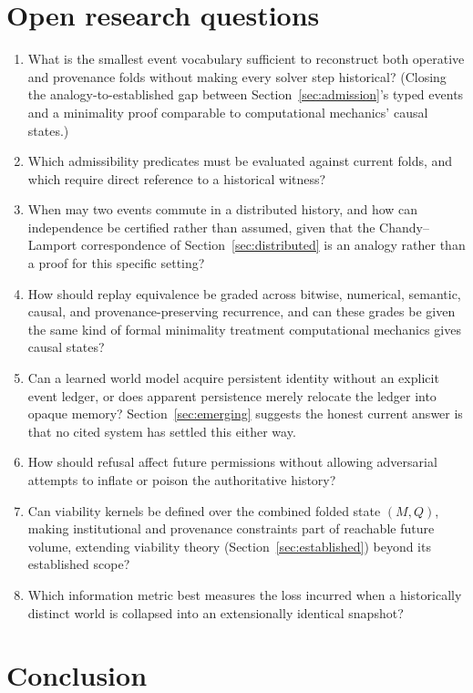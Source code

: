 \documentclass[11pt]{article}
\begin{document}
\section{Open research questions}
\label{sec:questions}

\begin{enumerate}
\item What is the smallest event vocabulary sufficient to reconstruct both operative and provenance folds without making every solver step historical? (Closing the analogy-to-established gap between Section~\ref{sec:admission}'s typed events and a minimality proof comparable to computational mechanics' causal states.)
\item Which admissibility predicates must be evaluated against current folds, and which require direct reference to a historical witness?
\item When may two events commute in a distributed history, and how can independence be certified rather than assumed, given that the Chandy--Lamport correspondence of Section~\ref{sec:distributed} is an analogy rather than a proof for this specific setting?
\item How should replay equivalence be graded across bitwise, numerical, semantic, causal, and provenance-preserving recurrence, and can these grades be given the same kind of formal minimality treatment computational mechanics gives causal states?
\item Can a learned world model acquire persistent identity without an explicit event ledger, or does apparent persistence merely relocate the ledger into opaque memory? Section~\ref{sec:emerging} suggests the honest current answer is that no cited system has settled this either way.
\item How should refusal affect future permissions without allowing adversarial attempts to inflate or poison the authoritative history?
\item Can viability kernels be defined over the combined folded state $(M, Q)$, making institutional and provenance constraints part of reachable future volume, extending viability theory (Section~\ref{sec:established}) beyond its established scope?
\item Which information metric best measures the loss incurred when a historically distinct world is collapsed into an extensionally identical snapshot?
\end{enumerate}

\section{Conclusion}
\label{sec:conclusion}
\end{document}
